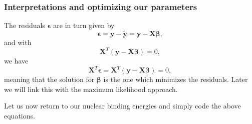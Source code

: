 \documentclass{beamer}
\begin{document}
\begin{frame}
\frametitle{Interpretations and optimizing our parameters}

\begin{block}{}
The residuals $\bm{\epsilon}$ are in turn given by
\[
\bm{\epsilon} = \bm{y}-\bm{\tilde{y}} = \bm{y}-\bm{X}\bm{\beta},
\]
and with 
\[
\bm{X}^T\left( \bm{y}-\bm{X}\bm{\beta}\right)= 0, 
\]
we have
\[
\bm{X}^T\bm{\epsilon}=\bm{X}^T\left( \bm{y}-\bm{X}\bm{\beta}\right)= 0, 
\]
meaning that the solution for $\bm{\beta}$ is the one which minimizes the residuals.  Later we will link this with the maximum likelihood approach.

\end{block}

Let us now return to our nuclear binding energies and simply code the above equations.
\end{frame}
\end{document}
